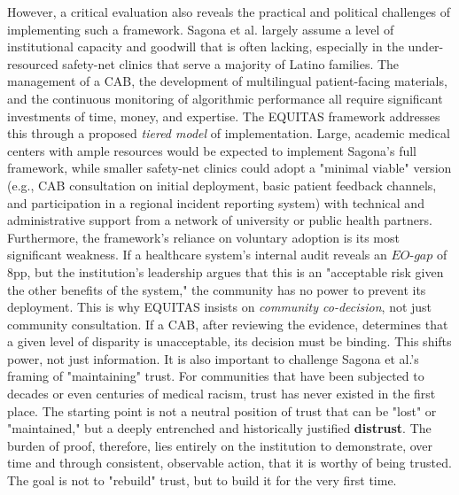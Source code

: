 \documentclass[11pt,twoside]{article}
\DeclareRobustCommand{\EOgap}{EO\text{-}gap\xspace}
\DeclareRobustCommand{\pp}{pp\xspace} %
\begin{document}
However, a critical evaluation also reveals the practical and political challenges of implementing such a framework. Sagona et al. largely assume a level of institutional capacity and goodwill that is often lacking, especially in the under-resourced safety-net clinics that serve a majority of Latino families. The management of a CAB, the development of multilingual patient-facing materials, and the continuous monitoring of algorithmic performance all require significant investments of time, money, and expertise. The EQUITAS framework addresses this through a proposed \textit{tiered model} of implementation. Large, academic medical centers with ample resources would be expected to implement Sagona's full framework, while smaller safety-net clinics could adopt a "minimal viable" version (e.g., CAB consultation on initial deployment, basic patient feedback channels, and participation in a regional incident reporting system) with technical and administrative support from a network of university or public health partners. Furthermore, the framework's reliance on voluntary adoption is its most significant weakness. If a healthcare system's internal audit reveals an $\EOgap$ of 8\pp, but the institution's leadership argues that this is an "acceptable risk given the other benefits of the system," the community has no power to prevent its deployment. This is why EQUITAS insists on \textit{community co-decision}, not just community consultation. If a CAB, after reviewing the evidence, determines that a given level of disparity is unacceptable, its decision must be binding. This shifts power, not just information. It is also important to challenge Sagona et al.'s framing of "maintaining" trust. For communities that have been subjected to decades or even centuries of medical racism, trust has never existed in the first place. The starting point is not a neutral position of trust that can be "lost" or "maintained," but a deeply entrenched and historically justified \textbf{distrust}. The burden of proof, therefore, lies entirely on the institution to demonstrate, over time and through consistent, observable action, that it is worthy of being trusted. The goal is not to "rebuild" trust, but to build it for the very first time.
\end{document}

